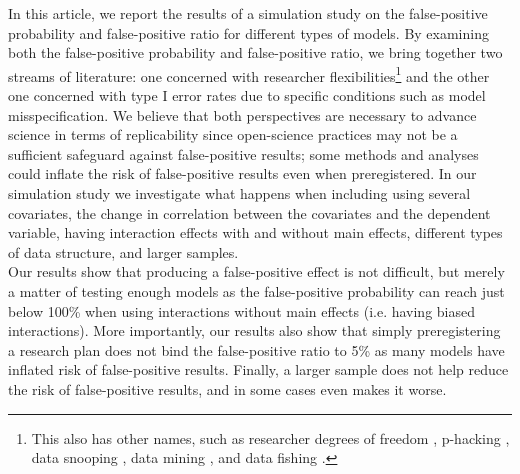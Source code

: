 In this article, we report the results of a simulation study on the false-positive probability and false-positive ratio for different types of models. By examining both the false-positive probability and false-positive ratio, we bring together two streams of literature: one concerned with researcher flexibilities\footnote{This also has other names, such as researcher degrees of freedom \citep{Simmons2011}, p-hacking \citep{simonsohn2014p}, data snooping \citep{white2000reality}, data mining \citep{lovell1983}, and data fishing \citep{selvin1966data}.} and the other one concerned with type I error rates due to specific conditions such as model misspecification. We believe that both perspectives are necessary to advance science in terms of replicability since open-science practices may not be a sufficient safeguard against false-positive results; some methods and analyses could inflate the risk of false-positive results even when preregistered. In our simulation study we investigate what happens when including using several covariates, the change in correlation between the covariates and the dependent variable, having interaction effects with and without main effects, different types of data structure, and larger samples. \\ 
Our results show that producing a false-positive effect is not difficult, but merely a matter of testing enough models as the false-positive probability can reach just below 100\% when using interactions without main effects (i.e. having biased interactions). More importantly, our results also show that simply preregistering a research plan does not bind the false-positive ratio to 5\% as many models have inflated risk of false-positive results. Finally, a larger sample does not help reduce the risk of false-positive results, and in some cases even makes it worse. 
